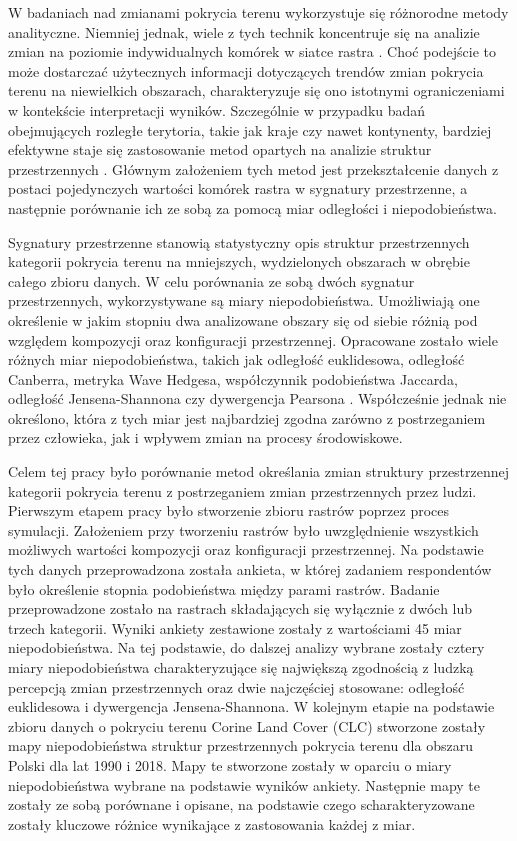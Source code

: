 \documentclass{amuthesis}
\begin{document}
W badaniach nad zmianami pokrycia terenu wykorzystuje się różnorodne
metody analityczne. Niemniej jednak, wiele z tych technik koncentruje
się na analizie zmian na poziomie indywidualnych komórek w siatce rastra
\autocite{ChangeDetectionTechniques}. Choć podejście to może dostarczać
użytecznych informacji dotyczących trendów zmian pokrycia terenu na
niewielkich obszarach, charakteryzuje się ono istotnymi ograniczeniami w
kontekście interpretacji wyników. Szczególnie w przypadku badań
obejmujących rozległe terytoria, takie jak kraje czy nawet kontynenty,
bardziej efektywne staje się zastosowanie metod opartych na analizie
struktur przestrzennych \autocite{Netzel2015}. Głównym założeniem tych
metod jest przekształcenie danych z postaci pojedynczych wartości
komórek rastra w sygnatury przestrzenne, a następnie porównanie ich ze
sobą za pomocą miar odległości i niepodobieństwa.

Sygnatury przestrzenne stanowią statystyczny opis struktur
przestrzennych kategorii pokrycia terenu na mniejszych, wydzielonych
obszarach w obrębie całego zbioru danych. W celu porównania ze sobą
dwóch sygnatur przestrzennych, wykorzystywane są miary niepodobieństwa.
Umożliwiają one określenie w jakim stopniu dwa analizowane obszary się
od siebie różnią pod względem kompozycji oraz konfiguracji
przestrzennej. Opracowane zostało wiele różnych miar niepodobieństwa,
takich jak odległość euklidesowa, odległość Canberra, metryka Wave
Hedgesa, współczynnik podobieństwa Jaccarda, odległość Jensena-Shannona
czy dywergencja Pearsona \autocite{Cha2007}. Współcześnie jednak nie
określono, która z tych miar jest najbardziej zgodna zarówno z
postrzeganiem przez człowieka, jak i wpływem zmian na procesy
środowiskowe.

Celem tej pracy było porównanie metod określania zmian struktury
przestrzennej kategorii pokrycia terenu z postrzeganiem zmian
przestrzennych przez ludzi. Pierwszym etapem pracy było stworzenie
zbioru rastrów poprzez proces symulacji. Założeniem przy tworzeniu
rastrów było uwzględnienie wszystkich możliwych wartości kompozycji oraz
konfiguracji przestrzennej. Na podstawie tych danych przeprowadzona
została ankieta, w której zadaniem respondentów było określenie stopnia
podobieństwa między parami rastrów. Badanie przeprowadzone zostało na
rastrach składających się wyłącznie z dwóch lub trzech kategorii. Wyniki
ankiety zestawione zostały z wartościami 45 miar niepodobieństwa. Na tej
podstawie, do dalszej analizy wybrane zostały cztery miary
niepodobieństwa charakteryzujące się największą zgodnością z ludzką
percepcją zmian przestrzennych oraz dwie najczęściej stosowane:
odległość euklidesowa i dywergencja Jensena-Shannona. W kolejnym etapie
na podstawie zbioru danych o pokryciu terenu Corine Land Cover (CLC)
stworzone zostały mapy niepodobieństwa struktur przestrzennych pokrycia
terenu dla obszaru Polski dla lat 1990 i 2018. Mapy te stworzone zostały
w oparciu o miary niepodobieństwa wybrane na podstawie wyników ankiety.
Następnie mapy te zostały ze sobą porównane i opisane, na podstawie
czego scharakteryzowane zostały kluczowe różnice wynikające z
zastosowania każdej z miar.
\end{document}
